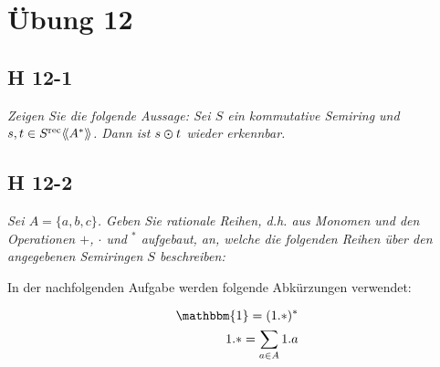 \documentclass{scrartcl}
\newcommand{\llangle}{\langle\hspace{-0.2em}\langle}
\newcommand{\rrangle}{\rangle\hspace{-0.2em}\rangle}
\begin{document}
\section{Übung 12}

\subsection{H 12-1}

\textsl{Zeigen Sie die folgende Aussage: Sei $S$ ein kommutative Semiring und $s, t \in S^{\text{rec}}\llangle A^* \rrangle$. Dann ist $s \varodot t$ wieder erkennbar.}

\subsection{H 12-2}

\textsl{Sei $A = \{a, b, c\}$. Geben Sie rationale Reihen, d.h. aus Monomen und den Operationen $+$, $\cdot$ und ${}^*$ aufgebaut, an, welche die folgenden Reihen über den angegebenen Semiringen $S$ beschreiben:}

In der nachfolgenden Aufgabe werden folgende Abkürzungen verwendet:

\begin{align*}
  \mathbbm{1} = (1.*)^*\\
  1.* = \sum\limits_{a \in A} 1.a\\
\end{align*}
\end{document}
